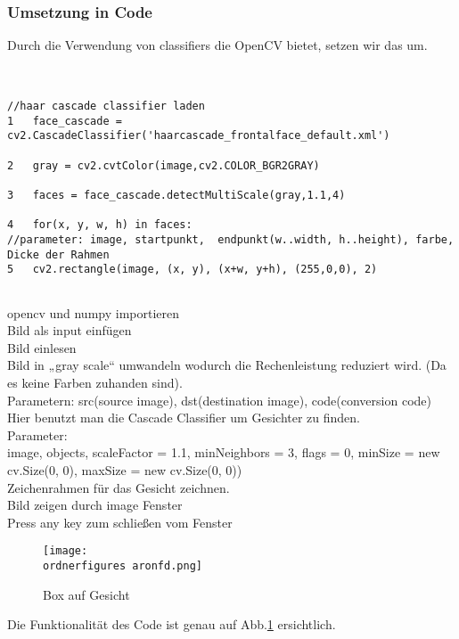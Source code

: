 \subsubsection{Umsetzung in Code}

Durch die Verwendung von classifiers die OpenCV bietet, setzen wir das um. \\\\
\begin{lstlisting}

//haar cascade classifier laden 
1	face_cascade = cv2.CascadeClassifier('haarcascade_frontalface_default.xml')

2	gray = cv2.cvtColor(image,cv2.COLOR_BGR2GRAY)

3	faces = face_cascade.detectMultiScale(gray,1.1,4)

4	for(x, y, w, h) in faces:
//parameter: image, startpunkt,  endpunkt(w..width, h..height), farbe, Dicke der Rahmen
5	cv2.rectangle(image, (x, y), (x+w, y+h), (255,0,0), 2) 


\end{lstlisting}
opencv und numpy importieren \\
Bild als input einfügen\\
Bild einlesen\\
Bild in „gray scale“ umwandeln wodurch die Rechenleistung reduziert wird.
(Da es keine Farben zuhanden sind).\\
Parametern: src(source image), dst(destination image), code(conversion code)\\
Hier benutzt man die Cascade Classifier um Gesichter zu finden.\\
Parameter: \\
image, objects, scaleFactor = 1.1, minNeighbors = 3, flags = 0, minSize = new cv.Size(0, 0), maxSize = new cv.Size(0, 0)) \\ 
Zeichenrahmen für das Gesicht zeichnen.\\
Bild zeigen durch image Fenster \\
Press any key zum schließen vom Fenster\\


\begin{figure}
	\centering
	\texttt{[image: \\ordnerfigures aronfd.png]}
	\caption{ Box auf Gesicht}
	\label{fig:aron}
\end{figure}

Die Funktionalität des Code ist genau auf Abb.\ref{fig:aron} ersichtlich. \\

